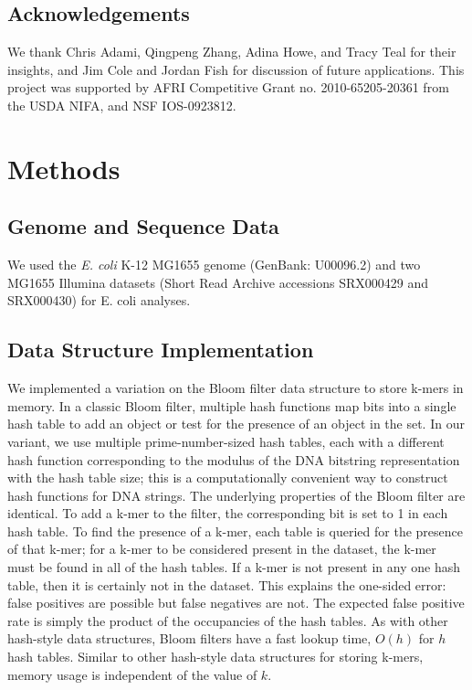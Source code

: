 \documentclass[12pt]{article} \usepackage{simplemargins}
\begin{document}
\subsection{Acknowledgements}

We thank Chris Adami, Qingpeng Zhang, Adina Howe, and Tracy Teal for
their insights, and Jim Cole and Jordan Fish for discussion of future
applications.  This project was supported by AFRI Competitive Grant
no. 2010-65205-20361 from the USDA NIFA, and NSF IOS-0923812.


\section{Methods}

\subsection{Genome and Sequence Data}
We used the \emph{E. coli} K-12 MG1655 genome (GenBank: U00096.2) and two MG1655 Illumina 
datasets (Short Read Archive accessions SRX000429 and SRX000430) for E. coli
analyses. 

\subsection{Data Structure Implementation}
We implemented a variation on the Bloom filter data structure to store
k-mers in memory. In a classic Bloom filter, multiple hash functions
map bits into a single hash table to add an object or test for the presence
of an object in the set. In our variant, we use multiple
prime-number-sized hash tables, each with a different hash
function corresponding to the modulus of the DNA bitstring
representation with the hash table size; this is a computationally convenient way to construct hash functions for DNA strings.  The underlying properties of
the Bloom filter are identical.  To add a k-mer to the
filter, the corresponding bit is set to 1 in each hash table.  To find
the presence of a k-mer, each table is queried for the presence of
that k-mer; for a k-mer to be considered present in the dataset, the
k-mer must be found in all of the hash tables.  If a k-mer is not
present in any one hash table, then it is certainly not in the
dataset. This explains the one-sided error: false positives are
possible but false negatives are not. The expected false positive rate
is simply the product of the occupancies of the hash tables.  As with
other hash-style data structures, Bloom filters have a fast lookup
time, $O(h)$ for $h$ hash tables.  Similar to other hash-style data
structures for storing k-mers, memory usage is independent of the
value of $k$.
\end{document}
